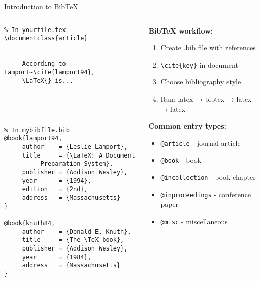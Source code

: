 \begin{frame}[fragile]{Introduction to BibTeX}
     \begin{columns}
          \begin{column}{0.5\textwidth}
               \begin{lstlisting}
% In yourfile.tex
\documentclass{article}

     
     According to Lamport~\cite{lamport94},
     \LaTeX{} is...
     
     
     
     

               \end{lstlisting}
               
               \begin{lstlisting}
% In mybibfile.bib
@book{lamport94,
     author    = {Leslie Lamport},
     title     = {\LaTeX: A Document 
          Preparation System},
     publisher = {Addison Wesley},
     year      = {1994},
     edition   = {2nd},
     address   = {Massachusetts}
}

@book{knuth84,
     author    = {Donald E. Knuth},
     title     = {The \TeX book},
     publisher = {Addison Wesley},
     year      = {1984},
     address   = {Massachusetts}
}
               \end{lstlisting}
          \end{column}
          
          \begin{column}{0.5\textwidth}
               \textbf{BibTeX workflow:}
               \begin{enumerate}
                    \item Create .bib file with references
                    \item \texttt{\textbackslash cite\{key\}} in document
                    \item Choose bibliography style
                    \item Run: latex → bibtex → latex → latex
               \end{enumerate}
               
               \textbf{Common entry types:}
               \begin{itemize}
                    \item \texttt{@article} - journal article
                    \item \texttt{@book} - book
                    \item \texttt{@incollection} - book chapter
                    \item \texttt{@inproceedings} - conference paper
                    \item \texttt{@misc} - miscellaneous
               \end{itemize}
               

\end{column}
\end{columns}
\end{frame}
